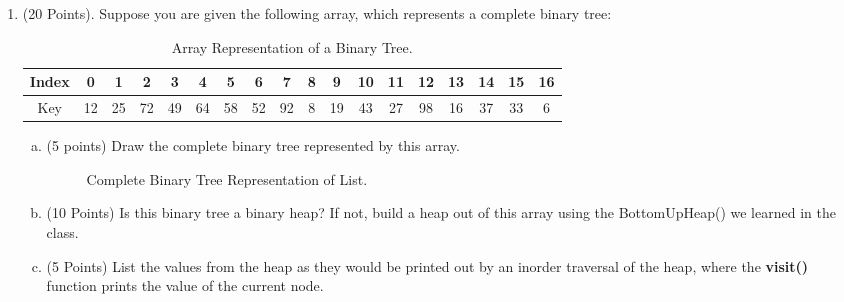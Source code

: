 \documentclass{article}
\begin{document}
\begin{enumerate}
\item(20 Points). Suppose you are given the following array, which
represents a complete binary tree:
\begin{table}[h]
  \begin{center}
    \begin{tabular}{|c|c|c|c|c|c|c|c|c|c|c|c|c|c|c|c|c|c|} 
      \hline Index &0&1&2&3&4&5&6&7&8&9&10&11&12&13&14&15&16 \\
      \hline Key&12&25&72&49&64&58&52&92&8&19&43&27&98&16&37&33&6\\
      \hline
    \end{tabular}
    \caption{Array Representation of a Binary Tree.} 
    \vspace{-15pt}
  \end{center}
\end{table}
\begin{enumerate}[(a)]
\item (5 points) Draw the complete binary tree represented by this
array. 
 \\
\begin{figure}[H]
  \vspace{-10pt}
  \begin{center}
    \caption{Complete Binary Tree Representation of
      List.\label{fig:complete_tree}} 
    \vspace{-15pt}
  \end{center}
\end{figure}

\item (10 Points) Is this binary tree a binary heap? If not, build a heap
out of this array using the BottomUpHeap() we learned in the class. 

\item (5 Points) List the values from the heap as they would be printed
out by an inorder traversal of the heap, where the \textbf{visit()} function
prints the value of the current node. 

\end{enumerate}
\end{enumerate}                 %
\end{document}
